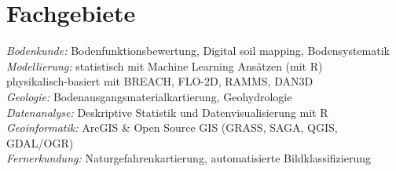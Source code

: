\documentclass[a4paper]{twentysecondcv} %
\begin{document}

\aboutme{} %







\makeprofile %




\section{Fachgebiete}

\emph{Bodenkunde:} Bodenfunktionsbewertung, Digital soil mapping, Bodensystematik\\[0.3em]
\emph{Modellierung:} statistisch mit Machine Learning Ans\"atzen (mit R)\\
\hspace*{6em}           physikalisch-basiert mit BREACH, FLO-2D, RAMMS, DAN3D\\[0.3em]
\emph{Geologie:} Bodenausgangsmaterialkartierung, Geohydrologie\\[0.3em]
\emph{Datenanalyse:} Deskriptive Statistik und Datenvisualisierung mit R\\[0.3em]
\emph{Geoinformatik: }ArcGIS \& Open Source GIS (GRASS, SAGA, QGIS, GDAL/OGR)\\[0.3em]
\emph{Fernerkundung:} Naturgefahrenkartierung, automatisierte Bildklassifizierung\\[0.3em]
\end{document}
